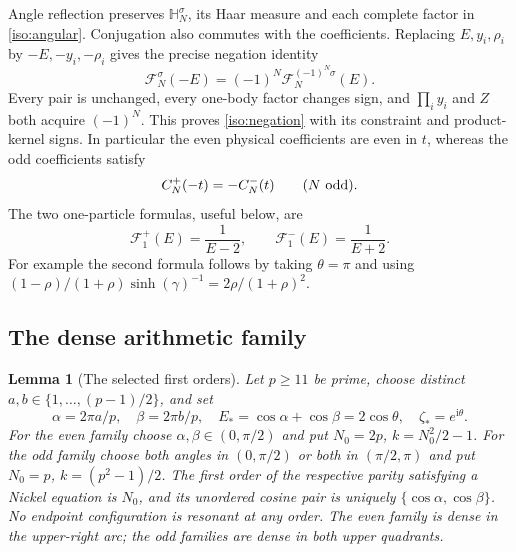 \documentclass[11pt]{article}
\numberwithin{equation}{section}
\newtheorem{lemma}[theorem]{Lemma}
\theoremstyle{definition}
\newcommand{\ii}{\mathrm i}
\begin{document}
Angle reflection preserves $\mathbb H_N^\sigma$, its Haar measure and
each complete factor in \eqref{iso:angular}.  Conjugation also
commutes with the coefficients.  Replacing ${E},y_i,\rho_i$ by
$-{E},-y_i,-\rho_i$ gives the precise negation identity
\begin{equation}\label{iso:negation}
 \mathcal F_N^\sigma(-{E})
   =(-1)^N\mathcal F_N^{(-1)^N\sigma}({E}).
\end{equation}
Every pair is unchanged, every one-body factor changes sign, and
$\prod_i y_i$ and $Z$ both acquire $(-1)^N$.  This proves
\eqref{iso:negation} with its constraint and product-kernel signs.
In particular the even physical coefficients are even in $t$, whereas
the odd coefficients satisfy
\begin{equation}\label{eq:iso-odd-negation}
 C_N^+(-t)=-C_N^-(t)\qquad(N\ {\rm odd}).
\end{equation}
The two one-particle formulas, useful below, are
\begin{equation}\label{eq:iso-one-particle}
 \mathcal F_1^+({E})=\frac1{{E}-2},\qquad
 \mathcal F_1^-({E})=\frac1{{E}+2}.
\end{equation}
For example the second formula follows by taking $\theta=\pi$ and
using $(1-\rho)/(1+\rho)\sinh(\gamma)^{-1}
=2\rho/(1+\rho)^2$.


\subsection{The dense arithmetic family}
\begin{lemma}[The selected first orders]\label{iso:arithmetic}
Let $p\ge11$ be prime, choose distinct
$a,b\in\{1,\ldots,(p-1)/2\}$, and set
\[
 \alpha=2\pi a/p,\quad\beta=2\pi b/p,\quad
 E_*=\cos\alpha+\cos\beta=2\cos\theta,
 \quad\zeta_*=e^{\ii\theta}.
\]
For the even family choose $\alpha,\beta\in(0,\pi/2)$ and put
$N_0=2p$, $k=N_0^2/2-1$. For the odd family choose both angles in
$(0,\pi/2)$ or both in $(\pi/2,\pi)$ and put
$N_0=p$, $k=(p^2-1)/2$.
The first order of the respective parity satisfying a Nickel equation is
$N_0$, and its unordered cosine pair is uniquely
$\{\cos\alpha,\cos\beta\}$. No endpoint configuration is resonant at any
order. The even family is dense in the upper-right arc; the odd families
are dense in both upper quadrants.
\end{lemma}
\end{document}
